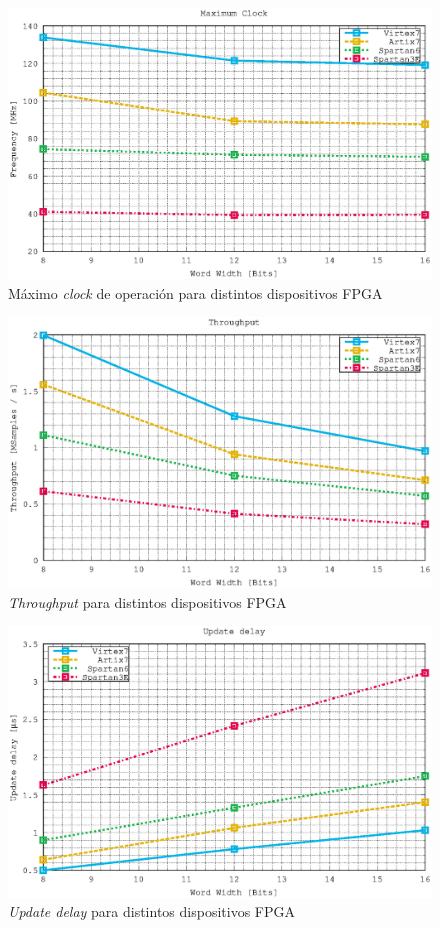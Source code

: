 \begin{figure}[h!]
    \centering
        \includegraphics[width = 11 cm]{./figures/C05-max_clock}
        \caption{Máximo \textit{clock} de operación para distintos dispositivos FPGA}
        \label{fig:max_clock}
\end{figure}

\begin{figure}[htb!]
    \centering
        \includegraphics[width = 11 cm]{./figures/C05-throughput}
        \caption{\textit{Throughput} para distintos dispositivos FPGA}
        \label{fig:throughput}
\end{figure}

\newpage

\begin{figure}[htb!]
    \centering
        \includegraphics[width = 11 cm]{./figures/C05-delay}
        \caption{\textit{Update delay} para distintos dispositivos FPGA}
        \label{fig:delay}
\end{figure}

